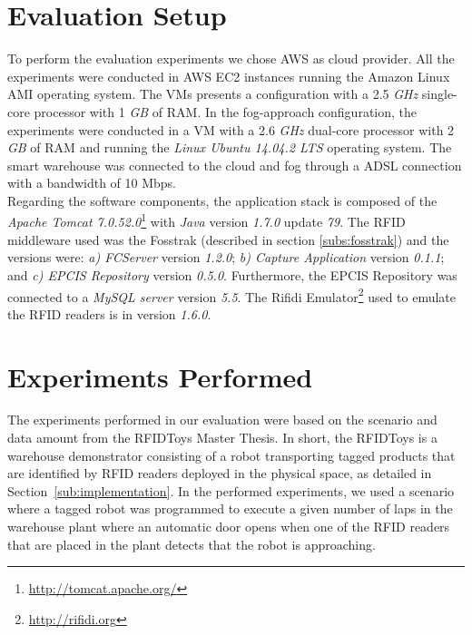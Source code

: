 \section{Evaluation Setup}
\label{sec:eval_setup}
To perform the evaluation experiments we chose \gls{AWS} as cloud provider. All the experiments were
conducted in \gls{AWS} \gls{EC2} instances running the Amazon Linux \gls{AMI} operating system. The \glspl{VM}
presents a configuration with a 2.5 \textit{\gls{GHz}} single-core processor with 1 \textit{\gls{GB}} of
\gls{RAM}. In the fog-approach configuration, the experiments were conducted in a \gls{VM} with
a 2.6 \textit{\gls{GHz}} dual-core processor with 2 \textit{\gls{GB}} of \gls{RAM} and running
the \textit{Linux Ubuntu 14.04.2 LTS} operating system. The smart warehouse was connected to the cloud
and fog through a \gls{ADSL} connection with a bandwidth of 10 Mbps.\\

Regarding the software components, the application stack is composed of the \textit{Apache Tomcat 7.0.52.0}\footnote{\url{http://tomcat.apache.org/}}
with \textit{Java} version \textit{1.7.0} update \textit{79}. The \gls{RFID} middleware used was the Fosstrak
(described in section \ref{subs:fosstrak}) and the versions were: \textit{a) \gls{FCServer}} version
\textit{1.2.0}; \textit{b) Capture Application} version \textit{0.1.1}; and \textit{c) \gls{EPCIS} Repository}
version \textit{0.5.0}. Furthermore, the \gls{EPCIS} Repository was connected to a \textit{MySQL server}
version \textit{5.5}. The Rifidi Emulator\footnote{\url{http://rifidi.org}} used to emulate the \gls{RFID}
readers is in version \textit{1.6.0}.

\section{Experiments Performed}
\label{sec:eval_experiments}
The experiments performed in our evaluation were based on the scenario and data amount from the RFIDToys \cite{Correia:Thesis:2014}
Master Thesis. In short, the RFIDToys is a warehouse demonstrator consisting of a robot transporting
tagged products that are identified by RFID readers deployed in the physical space, as detailed in
Section~\ref{sub:implementation}. In the performed experiments, we used a scenario where a tagged
robot was programmed to execute  a given number of laps in the warehouse plant where an automatic
door opens when one of the RFID readers that are placed in the plant detects that the robot is
approaching.\\

